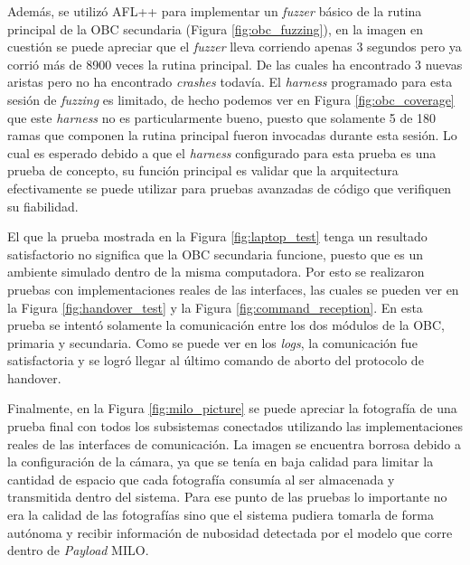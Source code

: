 Además, se utilizó AFL++ para implementar un \textit{fuzzer} básico de la rutina principal de la OBC secundaria (Figura \ref{fig:obc_fuzzing}), en la imagen en cuestión se puede apreciar que el \textit{fuzzer} lleva corriendo apenas 3 segundos pero ya corrió más de 8900 veces la rutina principal. De las cuales ha encontrado 3 nuevas aristas pero no ha encontrado \textit{crashes} todavía. El \textit{harness} programado para esta sesión de \textit{fuzzing} es limitado, de hecho podemos ver en Figura \ref{fig:obc_coverage} que este \textit{harness} no es particularmente bueno, puesto que solamente 5 de 180 ramas que componen la rutina principal fueron invocadas durante esta sesión. Lo cual es esperado debido a que el \textit{harness} configurado para esta prueba es una prueba de concepto, su función principal es validar que la arquitectura efectivamente se puede utilizar para pruebas avanzadas de código que verifiquen su fiabilidad.

El que la prueba mostrada en la Figura \ref{fig:laptop_test} tenga un resultado satisfactorio no significa que la OBC secundaria funcione, puesto que es un ambiente simulado dentro de la misma computadora. Por esto se realizaron pruebas con implementaciones reales de las interfaces, las cuales se pueden ver en la Figura \ref{fig:handover_test} y la Figura \ref{fig:command_reception}. En esta prueba se intentó solamente la comunicación entre los dos módulos de la OBC, primaria y secundaria. Como se puede ver en los \textit{logs}, la comunicación fue satisfactoria y se logró llegar al último comando de aborto del protocolo de handover.

Finalmente, en la Figura \ref{fig:milo_picture} se puede apreciar la fotografía de una prueba final con todos los subsistemas conectados utilizando las implementaciones reales de las interfaces de comunicación. La imagen se encuentra borrosa debido a la configuración de la cámara, ya que se tenía en baja calidad para limitar la cantidad de espacio que cada fotografía consumía al ser almacenada y transmitida dentro del sistema. Para ese punto de las pruebas lo importante no era la calidad de las fotografías sino que el sistema pudiera tomarla de forma autónoma y recibir información de nubosidad detectada por el modelo que corre dentro de \textit{Payload} MILO.
